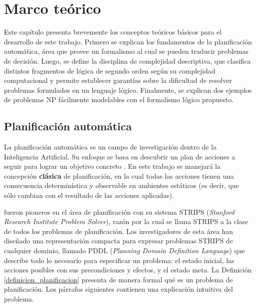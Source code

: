 
\chapter{Marco teórico}
\label{Chapter1}

Este capítulo presenta brevemente los conceptos teóricos básicos para el
desarrollo de este trabajo. Primero se explican los fundamentos de la
planificación automática, área que provee un formalismo al cual se pueden
traducir problemas de decisión. Luego, se define la disciplina de complejidad
descriptiva, que clasifica distintos fragmentos de lógica de segundo orden
según su complejidad computacional y permite establecer garantías sobre la
dificultad de resolver problemas formulados en un lenguaje lógico.
Finalmente, se explican dos ejemplos de problemas NP fácilmente modelables
con el formalismo lógico propuesto.

\section{Planificación automática}
La planificación automática es un campo de investigación dentro de la Inteligencia
Artificial. Su enfoque se basa en descubrir un plan de acciones a seguir para
lograr un objetivo concreto \citep{russell:book}. En este trabajo se manejará
la concepción \textbf{clásica} de planificación, en la cual todas las acciones
tienen una consecuencia determinística y observable en ambientes estáticos (es
decir, que sólo cambian con el resultado de las acciones aplicadas).

\cite{fikes:strips} fueron pioneros en el área de planificación con su sistema
STRIPS (\textit{Stanford Research
Institute Problem Solver}), razón por la cual se llama STRIPS a la clase de
todos los problemas de planificación.
Los investigadores de esta área han diseñado una representación compacta para
expresar problemas STRIPS de cualquier dominio, llamado PDDL
(\textit{Planning Domain Definition Language}) que describe todo lo necesario
para especificar un problema: el estado inicial, las acciones posibles con sus
precondiciones y efectos, y el estado meta. 
La Definición \ref{definicion_planificacion} presenta de manera formal qué es
un problema de planificación. Los párrafos siguientes contienen una explicación
intuitiva del problema.

